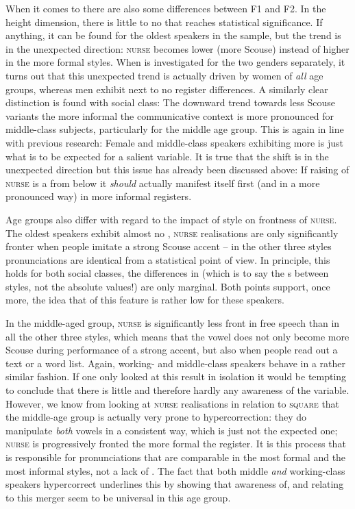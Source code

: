 When it comes to  there are also some differences between F1 and F2.
In the height dimension, there is little to no  that reaches statistical significance.
If anything, it can be found for the oldest speakers in the sample, but the trend is in the unexpected direction: \textsc{nurse} becomes lower (more Scouse) instead of higher in the more formal styles.
When  is investigated for the two genders separately, it turns out that this unexpected trend is actually driven by women of \emph{all} age groups, whereas men exhibit next to no register differences.
A similarly clear distinction is found with social class: The downward trend towards less Scouse variants the more informal the communicative context is more pronounced for middle-class subjects, particularly for the middle age group.
This is again in line with previous research: Female and middle-class speakers exhibiting more  is just what is to be expected for a salient variable.
It is true that the shift is in the unexpected direction but this issue has already been discussed above: If raising of \textsc{nurse} is a  from below it \emph{should} actually manifest itself first (and in a more pronounced way) in more informal registers.

Age groups also differ with regard to the impact of style on frontness of \textsc{nurse}.
The oldest speakers exhibit almost no , \textsc{nurse} realisations are only significantly fronter when people imitate a strong Scouse accent -- in the other three styles pronunciations are identical from a statistical point of view.
In principle, this holds for both social classes, the differences in  (which is to say the s between styles, not the absolute values!) are only marginal.
Both points support, once more, the idea that  of this feature is rather low for these speakers.

In the middle-aged group, \textsc{nurse} is significantly less front in free speech than in all the other three styles, which means that the vowel does not only become more Scouse during performance of a strong accent, but also when people read out a text or a word list.
Again, working- and middle-class speakers behave in a rather similar fashion.
If one only looked at this result in isolation it would be tempting to conclude that there is little  and therefore hardly any awareness of the variable.
However, we know from looking at \textsc{nurse} realisations in relation to \textsc{square} that the middle-age group is actually very prone to hypercorrection: they do manipulate \emph{both} vowels in a consistent way, which is just not the expected one; \textsc{nurse} is progressively fronted the more formal the register.
It is this process that is responsible for pronunciations that are comparable in the most formal and the most informal styles, not a lack of .
The fact that both middle \emph{and} working-class speakers hypercorrect underlines this by showing that awareness of, and  relating to this merger seem to be universal in this age group.

